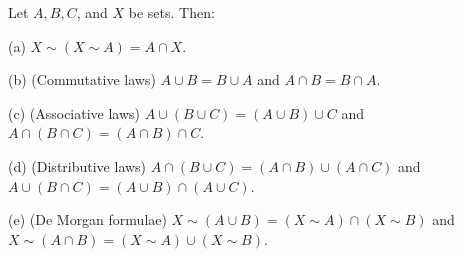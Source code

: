 Let $A, B, C$, and $X$ be sets. Then:

(a) $X \sim (X \sim A) = A \cap X$.

(b) (Commutative laws) $A \cup B = B \cup A$ and $A \cap B = B \cap A$.

(c) (Associative laws) $A \cup (B \cup C) = (A \cup B) \cup C$ and $A \cap (B \cap C) = (A \cap B) \cap C$.

(d) (Distributive laws) $A \cap (B \cup C) = (A \cap B) \cup (A \cap C)$ and $A \cup (B \cap C) = (A \cup B) \cap (A \cup C)$.

(e) (De Morgan formulae) $X \sim (A \cup B) = (X \sim A) \cap (X \sim B)$ and $X \sim (A \cap B) = (X \sim A) \cup (X \sim B)$.
